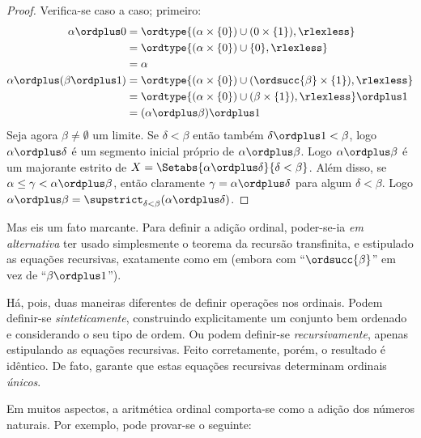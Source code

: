 \documentclass[../../../include/open-logic-section]{subfiles}
\begin{document}
\begin{proof}
Verifica-se caso a caso; primeiro:
\begin{align*}
	\alpha \ordplus  0
	& = \ordtype{(\alpha \times \{0\}) \cup (0 \times \{1\}), \rlexless} \\
	&= \ordtype{(\alpha \times \{0\}) \cup \{0\}, \rlexless}\\
	&= \alpha\\
	\alpha \ordplus (\beta \ordplus  1)
	&= \ordtype{(\alpha\times \{0\}) \cup (\ordsucc{\beta}\times \{1\}), \rlexless} \\
	&= \ordtype{(\alpha\times \{0\}) \cup (\beta \times \{1\}), \rlexless} \ordplus 1\\
	&= (\alpha \ordplus  \beta) \ordplus  1
\end{align*}
Seja agora $\beta \neq \emptyset$ um limite. Se $\delta < \beta$ então
também $\delta\ordplus 1 < \beta$, logo $\alpha \ordplus  \delta$ é um
segmento inicial próprio de $\alpha \ordplus  \beta$. Logo $\alpha
\ordplus  \beta$ é um majorante estrito de $X = \Setabs{\alpha
\ordplus  \delta}{\delta < \beta}$. Além disso, se $\alpha \leq \gamma <
\alpha \ordplus  \beta$, então claramente $\gamma = \alpha \ordplus
\delta$ para algum $\delta < \beta$. Logo $\alpha \ordplus  \beta =
\supstrict_{\delta< \beta}(\alpha\ordplus \delta)$.
\end{proof}

Mas eis um fato marcante. Para definir a adição ordinal, poder-se-ia
\emph{em alternativa} ter usado simplesmente o teorema da recursão transfinita, e
estipulado as equações recursivas, exatamente como em
 (embora com ``$\ordsucc{\beta}$''
em vez de ``$\beta \ordplus 1$'').

Há, pois, duas maneiras diferentes de definir operações nos
ordinais. Podem definir-se \emph{sinteticamente}, construindo explicitamente um conjunto bem ordenado e considerando o seu tipo de ordem. Ou
podem definir-se \emph{recursivamente}, apenas estipulando as equações
recursivas. Feito corretamente, porém, o resultado é idêntico. De fato,
 garante
que estas equações recursivas determinam ordinais \emph{únicos}.

Em muitos aspectos, a aritmética ordinal comporta-se como a adição dos
números naturais. Por exemplo, pode provar-se o seguinte:
\end{document}
